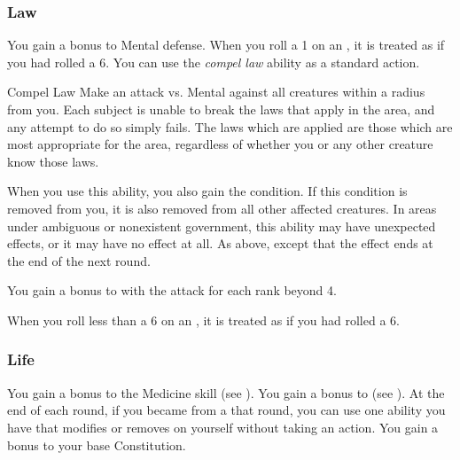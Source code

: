         \subsubsection{Law}
             You gain a  bonus to Mental defense.
             When you roll a 1 on an , it is treated as if you had rolled a 6.
             You can use the \textit{compel law} ability as a standard action.
            \begin{durationability}{Compel Law}
                \rankline
                Make an attack vs. Mental against all creatures within a \arealarge radius from you.
                \hit Each subject is unable to break the laws that apply in the area, and any attempt to do so simply fails.
                The laws which are applied are those which are most appropriate for the area, regardless of whether you or any other creature know those laws.

                When you use this ability, you also gain the condition.
                If this condition is removed from you, it is also removed from all other affected creatures.
                In areas under ambiguous or nonexistent government, this ability may have unexpected effects, or it may have no effect at all.
                \glance As above, except that the effect ends at the end of the next round.

                \rankline
                You gain a  bonus to  with the attack for each rank beyond 4.
            \end{durationability}
             When you roll less than a 6 on an , it is treated as if you had rolled a 6.

        \subsubsection{Life}
             You gain a  bonus to the Medicine skill (see ).
             You gain a  bonus to  (see ).
             At the end of each round, if you became \unconscious from a  that round, you can use one  ability you have that modifies  or removes  on yourself without taking an action.
             You gain a  bonus to your base Constitution.

